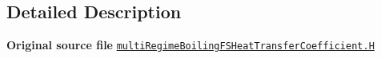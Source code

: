 \subsection{Detailed Description}
{\bfseries Original source file} \href{../../../home/carlo/data/GeN-Foam/GeN-Foam_ffn/GeN-Foam/GeN-Foam/classes/thermalHydraulics/src/physicsModels/heatTransferModels/FSHeatTransferCoefficientModels/multiRegimeBoiling/multiRegimeBoilingFSHeatTransferCoefficient.H}{\tt multi\+Regime\+Boiling\+F\+S\+Heat\+Transfer\+Coefficient.\+H} 